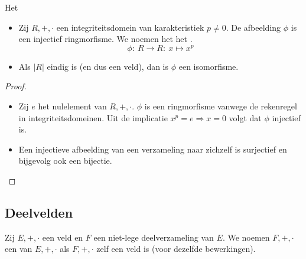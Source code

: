 \documentclass[main.tex]{subfiles}
\begin{document}
\begin{st}
  Het \\
  \begin{itemize}
  \item Zij $R,+,\cdot$ een integriteitsdomein van karakteristiek $p\neq 0$.
    De afbeelding $\phi$ is een injectief ringmorfisme.
    We noemen het het .
    \[ \phi:\ R \rightarrow R:\ x \mapsto x^{p} \]
  \item Als $|R|$ eindig is (en dus een veld), dan is $\phi$ een isomorfisme.
  \end{itemize}

  \begin{proof}
    \begin{itemize}
    \item Zij $e$ het nulelement van $R,+,\cdot$.  $\phi$ is een
      ringmorfisme vanwege de rekenregel in
      integriteitsdomeinen.
      Uit de implicatie $x^{p} = e \Rightarrow x = 0$ volgt dat $\phi$
      injectief is.  
    \item Een injectieve afbeelding van een verzameling naar zichzelf is surjectief en bijgevolg ook een bijectie. 
    \end{itemize}
  \end{proof}
\end{st}


\subsection{Deelvelden}
\label{sec:deelvelden}

\begin{de}
  Zij $E,+,\cdot$ een veld en $F$ een niet-lege deelverzameling van $E$.
  We noemen $F,+,\cdot$ een  van $E,+,\cdot$ als $F,+,\cdot$ zelf een veld is (voor dezelfde bewerkingen).
\end{de}
\end{document}
